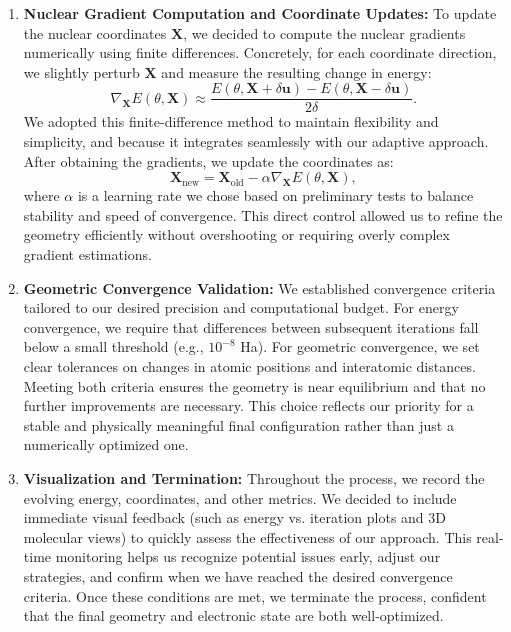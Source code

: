 \begin{enumerate}
    \item \textbf{Nuclear Gradient Computation and Coordinate Updates:}
    To update the nuclear coordinates \(\mathbf{X}\), we decided to compute the nuclear gradients numerically using finite differences. Concretely, for each coordinate direction, we slightly perturb \(\mathbf{X}\) and measure the resulting change in energy:
    \begin{equation}
    \nabla_{\mathbf{X}} E(\theta, \mathbf{X}) \approx \frac{E(\theta, \mathbf{X} + \delta \mathbf{u}) - E(\theta, \mathbf{X} - \delta \mathbf{u})}{2\delta}.
    \end{equation}
    We adopted this finite-difference method to maintain flexibility and simplicity, and because it integrates seamlessly with our adaptive approach. After obtaining the gradients, we update the coordinates as:
    \begin{equation}
    \mathbf{X}_{\text{new}} = \mathbf{X}_{\text{old}} - \alpha \nabla_{\mathbf{X}}E(\theta, \mathbf{X}),
    \end{equation}
    where \(\alpha\) is a learning rate we chose based on preliminary tests to balance stability and speed of convergence. This direct control allowed us to refine the geometry efficiently without overshooting or requiring overly complex gradient estimations.

    \item \textbf{Geometric Convergence Validation:}
    We established convergence criteria tailored to our desired precision and computational budget. For energy convergence, we require that differences between subsequent iterations fall below a small threshold (e.g., \(10^{-8}\) Ha). For geometric convergence, we set clear tolerances on changes in atomic positions and interatomic distances. Meeting both criteria ensures the geometry is near equilibrium and that no further improvements are necessary. This choice reflects our priority for a stable and physically meaningful final configuration rather than just a numerically optimized one.

    \item \textbf{Visualization and Termination:}
    Throughout the process, we record the evolving energy, coordinates, and other metrics. We decided to include immediate visual feedback (such as energy vs. iteration plots and 3D molecular views) to quickly assess the effectiveness of our approach. This real-time monitoring helps us recognize potential issues early, adjust our strategies, and confirm when we have reached the desired convergence criteria. Once these conditions are met, we terminate the process, confident that the final geometry and electronic state are both well-optimized.
\end{enumerate}

